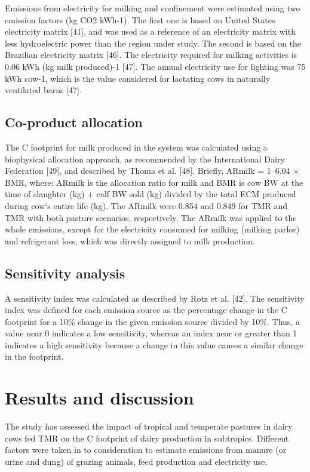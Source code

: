 \documentclass[11pt,a4paper]{article}
\begin{document}
Emissions from electricity for milking and confinement were estimated using two emission factors (kg CO2 kWh-1). The first one is based on United States electricity matrix [41], and was used as a reference of an electricity matrix with less hydroelectric power than the region under study. The second is based on the Brazilian electricity matrix [46]. The electricity required for milking activities is 0.06 kWh (kg milk produced)-1 [47]. The annual electricity use for lighting was 75 kWh cow-1, which is the value considered for lactating cows in naturally ventilated barns [47].

\subsection{Co-product allocation}

The C footprint for milk produced in the system was calculated using a biophysical allocation approach, as recommended by the International Dairy Federation [49], and described by Thoma et al. [48]. Briefly, ARmilk = 1–6.04 × BMR, where: ARmilk is the allocation ratio for milk and BMR is cow BW at the time of slaughter (kg) + calf BW sold (kg) divided by the total ECM produced during cow`s entire life (kg). The ARmilk were 0.854 and 0.849 for TMR and TMR with both pasture scenarios, respectively. The ARmilk was applied to the whole emissions, except for the electricity consumed for milking (milking parlor) and refrigerant loss, which was directly assigned to milk production.

\subsection{Sensitivity analysis}

A sensitivity index was calculated as described by Rotz et al. [42]. The sensitivity index was defined for each emission source as the percentage change in the C footprint for a 10\% change in the given emission source divided by 10\%. Thus, a value near 0 indicates a low sensitivity, whereas an index near or greater than 1 indicates a high sensitivity because a change in this value causes a similar change in the footprint.

\section{Results and discussion}

The study has assessed the impact of tropical and temperate pastures in dairy cows fed TMR on the C footprint of dairy production in subtropics. Different factors were taken in to consideration to estimate emissions from manure (or urine and dung) of grazing animals, feed production and electricity use.
\end{document}
